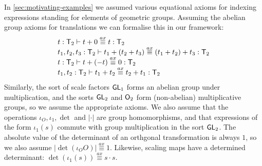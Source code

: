 \begin{example}
  \label{ex:two-dim-geo-axioms}
  In \autoref{sec:motivating-examples} we assumed 
  various equational axioms %
  for indexing expressions standing for
  elements of geometric groups. Assuming the abelian group axioms for
  translations we can formalise this in our %
  framework:
  \begin{displaymath}
    \begin{array}{l}
      t : \mathsf{T}_2 \vdash t + 0 \stackrel{ax}\equiv t : \mathsf{T}_2 \\
      t_1, t_2, t_3 : \mathsf{T}_2 \vdash t_1 + (t_2 + t_3) \stackrel{ax}\equiv (t_1 + t_2) + t_3 : \mathsf{T}_2 \\
      t : \mathsf{T}_2 \vdash t + (-t) \stackrel{ax}\equiv 0 : \mathsf{T}_2 \\
      t_1, t_2 : \mathsf{T}_2 \vdash t_1 + t_2 \stackrel{ax}\equiv t_2 + t_1 : \mathsf{T}_2 \\
    \end{array}
  \end{displaymath}
  Similarly, the sort of scale factors $\mathsf{GL}_1$ forms an abelian
  group under multiplication, and the sorts $\mathsf{GL}_2$ and
  $\mathsf{O}_2$ form (non-abelian) multiplicative groups, so we assume
  the appropriate axioms. We also assume that the operations $\iota_O,
  \iota_1, \det$ and $|\cdot|$ are group homomorphisms, and that
  expressions of the form $\iota_1(s)$ commute with group
  multiplication in the sort $\mathsf{GL}_2$. The absolute value of the
  determinant of an orthgonal transformation is always $1$, so we also
  assume $|\det(\iota_OO)| \stackrel{ax}\equiv 1$. Likewise, scaling
  maps have a determined determinant: $\det(\iota_1(s))
  \stackrel{ax}\equiv s \cdot s$.
\end{example}

